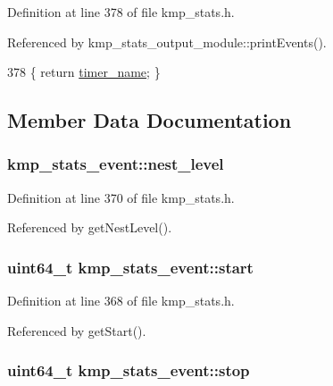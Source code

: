 Definition at line 378 of file kmp\-\_\-stats.\-h.



Referenced by kmp\-\_\-stats\-\_\-output\-\_\-module\-::print\-Events().


\begin{DoxyCode}
378 \{ \textcolor{keywordflow}{return} \hyperlink{classkmp__stats__event_afd16631d13a4b9a3bcf40e758c182c8b}{timer\_name}; \}
\end{DoxyCode}


\subsection{Member Data Documentation}
\hypertarget{classkmp__stats__event_ac2650266ee0040f60d5145d6b9c7fdd9}{
\subsubsection[{nest\-\_\-level}]{ kmp\-\_\-stats\-\_\-event\-::nest\-\_\-level\hspace{0.3cm}{\ttfamily [private]}}}\label{classkmp__stats__event_ac2650266ee0040f60d5145d6b9c7fdd9}


Definition at line 370 of file kmp\-\_\-stats.\-h.



Referenced by get\-Nest\-Level().

\hypertarget{classkmp__stats__event_aa014a405577493c27743ec39a2b9ea2a}{
\subsubsection[{start}]{\setlength{\rightskip}{0pt plus 5cm}uint64\-\_\-t kmp\-\_\-stats\-\_\-event\-::start\hspace{0.3cm}{\ttfamily [private]}}}\label{classkmp__stats__event_aa014a405577493c27743ec39a2b9ea2a}


Definition at line 368 of file kmp\-\_\-stats.\-h.



Referenced by get\-Start().

\hypertarget{classkmp__stats__event_a2a06a18d642394884c62461530dd4e68}{
\subsubsection[{stop}]{\setlength{\rightskip}{0pt plus 5cm}uint64\-\_\-t kmp\-\_\-stats\-\_\-event\-::stop\hspace{0.3cm}{\ttfamily [private]}}}\label{classkmp__stats__event_a2a06a18d642394884c62461530dd4e68}


